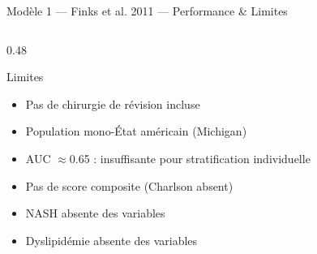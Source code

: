 \documentclass[aspectratio=169]{beamer}
\begin{document}
\begin{frame}[shrink=5]{Modèle 1 --- Finks et al. 2011 --- Performance \& Limites}
\begin{columns}[T]
\begin{column}{0.48\textwidth}
\begin{alertblock}{Limites}
\begin{itemize}
          \item Pas de chirurgie de révision incluse
          \item Population mono-État américain (Michigan)
          \item AUC $\approx$0.65 : insuffisante pour stratification individuelle
          \item Pas de score composite (Charlson absent)
          \item NASH absente des variables
          \item Dyslipidémie absente des variables
        \end{itemize}
      \end{alertblock}
    \end{column}
  \end{columns}
\end{frame}
\end{document}
